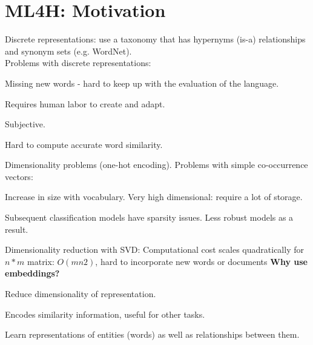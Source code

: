 \documentclass[12pt]{article}
\begin{document}
\section{ML4H: Motivation}
\par Discrete representations: use a taxonomy that has hypernyms (is-a) relationships and synonym sets (e.g. WordNet).
\\
Problems with discrete representations:
\ulb
\item Missing new words - hard to keep up with the evaluation of the language.
\item Requires human labor to create and adapt.
\item Subjective.
\item Hard to compute accurate word similarity.
\item Dimensionality problems (one-hot encoding).
\ule
Problems with simple co-occurrence vectors:
\ulb
\item Increase in size with vocabulary. Very high dimensional: require a lot of storage.
\item Subsequent classification models have sparsity issues. Less robust models as a result.
\item Dimensionality reduction with SVD: Computational cost scales quadratically for $n*m$ matrix: $O(mn2)$, hard to incorporate new words or documents
\ule
\textbf{Why use embeddings?}
\ulb
\item Reduce dimensionality of representation.
\item Encodes similarity information, useful for other tasks.
\item Learn representations of entities (words) as well as relationships between them.
\ule
 
\end{document}
